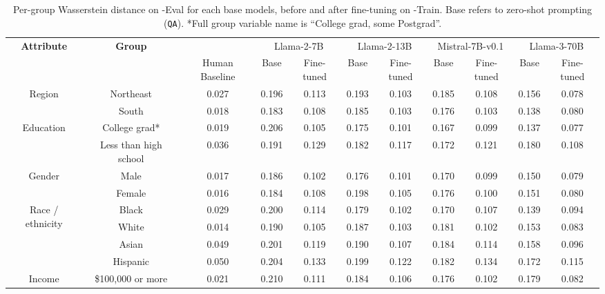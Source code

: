 \begin{table*}[ht]
    \centering
    \scriptsize
    \captionsetup{font=small}
    \caption{
    Per-group Wasserstein distance on \OURDATA-Eval for each base models, before and after fine-tuning on \OURDATA-Train. Base refers to zero-shot prompting (\texttt{QA}). *Full group variable name is ``College grad, some Postgrad''.
    }
    \label{table:per_group_gss}
    \begin{tabular}{cc|c|cc|cc|cc|cc}
    \toprule
    \multirow{2}{*}{\textbf{Attribute}}
    & \multirow{2}{*}{\textbf{Group}}
    & \multirow{1}{*}{}
    & \multicolumn{2}{c|}{Llama-2-7B}
    & \multicolumn{2}{c|}{Llama-2-13B}
    & \multicolumn{2}{c|}{Mistral-7B-v0.1}
    & \multicolumn{2}{c}{Llama-3-70B} \\
    & & Human Baseline & Base & Fine-tuned & Base & Fine-tuned & Base & Fine-tuned & Base & Fine-tuned \\
    \midrule
    \multirow{2}{*}{Region} &
    Northeast & 0.027 & 0.196 & 0.113 & 0.193 & 0.103 & 0.185 & 0.108 & 0.156 & 0.078 \\
    & South & 0.018 & 0.183 & 0.108 & 0.185 & 0.103 & 0.176 & 0.103 & 0.138 & 0.080 \\
    \midrule
    \multirow{2}{*}{Education} &
    College grad* & 0.019 & 0.206 & 0.105 & 0.175 & 0.101 & 0.167 & 0.099 & 0.137 & 0.077 \\
    & Less than high school & 0.036 & 0.191 & 0.129 & 0.182 & 0.117 & 0.172 & 0.121 & 0.180 & 0.108 \\
    \midrule
    \multirow{2}{*}{Gender} &
    Male & 0.017 & 0.186 & 0.102 & 0.176 & 0.101 & 0.170 & 0.099 & 0.150 & 0.079 \\
    & Female & 0.016 & 0.184 & 0.108 & 0.198 & 0.105 & 0.176 & 0.100 & 0.151 & 0.080 \\
    \midrule
    \multirow{4}{*}{Race / ethnicity} &
    Black & 0.029 & 0.200 & 0.114 & 0.179 & 0.102 & 0.170 & 0.107 & 0.139 & 0.094 \\
    & White & 0.014 & 0.190 & 0.105 & 0.187 & 0.103 & 0.181 & 0.102 & 0.153 & 0.083 \\
    & Asian & 0.049 & 0.201 & 0.119 & 0.190 & 0.107 & 0.184 & 0.114 & 0.158 & 0.096 \\
    & Hispanic & 0.050 & 0.204 & 0.133 & 0.199 & 0.122 & 0.182 & 0.134 & 0.172 & 0.115 \\
    \midrule
    \multirow{2}{*}{Income} &
    \$100,000 or more & 0.021 & 0.210 & 0.111 & 0.184 & 0.106 & 0.176 & 0.102 & 0.179 & 0.082 \\

\end{tabular}
\end{table*}
